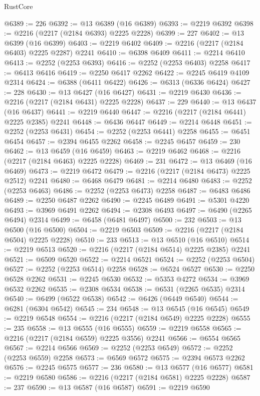 \begin{lexlean}{RustCore}
\begin{coremodule}
@6389 := 226
@6392 := @13 @6389 (@16 @6389)
@6393 := @2219 @6392
@6398 := @2216 (@2217 (@2184 @6393) @2225 @2228)
@6399 := 227
@6402 := @13 @6399 (@16 @6399)
@6403 := @2219 @6402
@6409 := @2216 (@2217 (@2184 @6403) @2225 @2287) @2241
@6410 := @6398 @6409
@6411 := @2214 @6410
@6413 := @2252 (@2253 @6393)
@6416 := @2252 (@2253 @6403) @2258
@6417 := @6413 @6416
@6419 := @2250 @6417 @2262
@6422 := @2245 @6419 @4109 @2314
@6424 := @6388 (@6411 @6422)
@6426 := @6313 (@6336 @6424)
@6427 := 228
@6430 := @13 @6427 (@16 @6427)
@6431 := @2219 @6430
@6436 := @2216 (@2217 (@2184 @6431) @2225 @2228)
@6437 := 229
@6440 := @13 @6437 (@16 @6437)
@6441 := @2219 @6440
@6447 := @2216 (@2217 (@2184 @6441) @2225 @2385) @2241
@6448 := @6436 @6447
@6449 := @2214 @6448
@6451 := @2252 (@2253 @6431)
@6454 := @2252 (@2253 @6441) @2258
@6455 := @6451 @6454
@6457 := @2394 @6455 @2262
@6458 := @2245 @6457
@6459 := 230
@6462 := @13 @6459 (@16 @6459)
@6463 := @2219 @6462
@6468 := @2216 (@2217 (@2184 @6463) @2225 @2228)
@6469 := 231
@6472 := @13 @6469 (@16 @6469)
@6473 := @2219 @6472
@6479 := @2216 (@2217 (@2184 @6473) @2225 @2512) @2241
@6480 := @6468 @6479
@6481 := @2214 @6480
@6483 := @2252 (@2253 @6463)
@6486 := @2252 (@2253 @6473) @2258
@6487 := @6483 @6486
@6489 := @2250 @6487 @2262
@6490 := @2245 @6489
@6491 := @5301 @4220
@6493 := @3969 @6491 @2262
@6494 := @2308 @6493
@6497 := @6490 (@2265 @6494) @2314
@6499 := @6458 (@6481 @6497)
@6500 := 232
@6503 := @13 @6500 (@16 @6500)
@6504 := @2219 @6503
@6509 := @2216 (@2217 (@2184 @6504) @2225 @2228)
@6510 := 233
@6513 := @13 @6510 (@16 @6510)
@6514 := @2219 @6513
@6520 := @2216 (@2217 (@2184 @6514) @2225 @2385) @2241
@6521 := @6509 @6520
@6522 := @2214 @6521
@6524 := @2252 (@2253 @6504)
@6527 := @2252 (@2253 @6514) @2258
@6528 := @6524 @6527
@6530 := @2250 @6528 @2262
@6531 := @2245 @6530
@6532 := @5353 @4272
@6534 := @3969 @6532 @2262
@6535 := @2308 @6534
@6538 := @6531 (@2265 @6535) @2314
@6540 := @6499 (@6522 @6538)
@6542 := @6426 (@6449 @6540)
@6544 := @6281 (@6304 @6542)
@6545 := 234
@6548 := @13 @6545 (@16 @6545)
@6549 := @2219 @6548
@6554 := @2216 (@2217 (@2184 @6549) @2225 @2228)
@6555 := 235
@6558 := @13 @6555 (@16 @6555)
@6559 := @2219 @6558
@6565 := @2216 (@2217 (@2184 @6559) @2225 @3556) @2241
@6566 := @6554 @6565
@6567 := @2214 @6566
@6569 := @2252 (@2253 @6549)
@6572 := @2252 (@2253 @6559) @2258
@6573 := @6569 @6572
@6575 := @2394 @6573 @2262
@6576 := @2245 @6575
@6577 := 236
@6580 := @13 @6577 (@16 @6577)
@6581 := @2219 @6580
@6586 := @2216 (@2217 (@2184 @6581) @2225 @2228)
@6587 := 237
@6590 := @13 @6587 (@16 @6587)
@6591 := @2219 @6590

\end{coremodule}
\end{lexlean}
